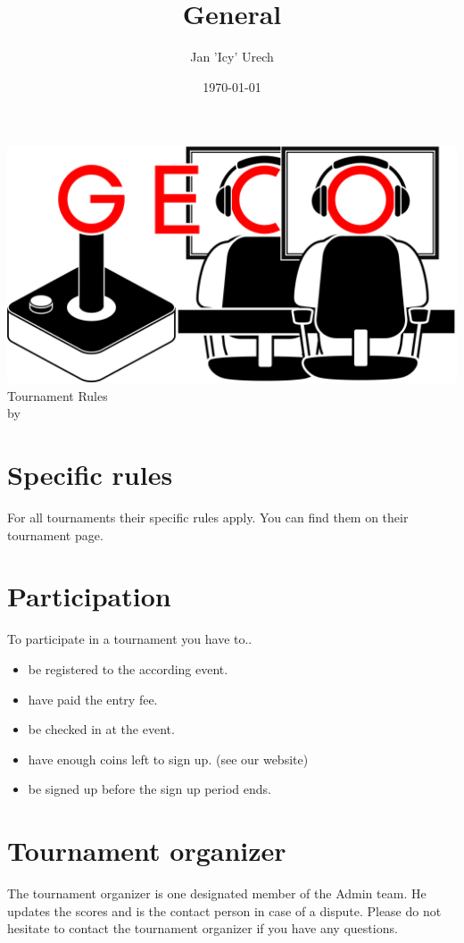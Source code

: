 \documentclass{article}
\title{General }
\author{Jan 'Icy' Urech}
\date{\today}
\begin{document}
\makeatletter
\begin{titlepage}
\centering
\includegraphics[scale=0.075]{img/GECo.png}\\
\LARGE \@title  Tournament Rules\\ \normalsize by \@author\\ \@date
\end{titlepage}
\makeatother


\clearpage

\tableofcontents
\clearpage


\section{Specific rules}
For all tournaments their specific rules apply. You can find them on their tournament page.



\section{Participation} 
To participate in a tournament you have to..
\begin{itemize}
	\item be registered to the according event.
	\item have paid the entry fee.
	\item be checked in at the event.
	\item have enough coins left to sign up. (see our website)
	\item be signed up before the sign up period ends.
\end{itemize}

\section{Tournament organizer}
The tournament organizer is one designated member of the Admin team. He updates the scores and is the contact person in case of a dispute. Please do not hesitate to contact the tournament organizer if you have any questions.
\end{document}
